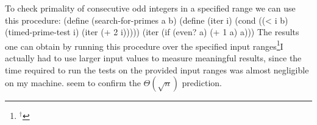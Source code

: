 To check primality of consecutive odd integers in a specified range we can use this procedure:
\begtt\scm
(define (search-for-primes a b)
  (define (iter i)
    (cond ((< i b) (timed-prime-test i) (iter (+ 2 i)))))
  (iter (if (even? a) (+ 1 a) a)))
\endtt
The results one can obtain by running this procedure over the specified input ranges\footnote{${}^\dag$}{\typoscale[900/900]I actually had to use larger input values to measure meaningful results, since the time required to run the tests on the provided input ranges was almost negligible on my machine.} seem to confirm the $\Theta(\sqrt n)$ prediction.
